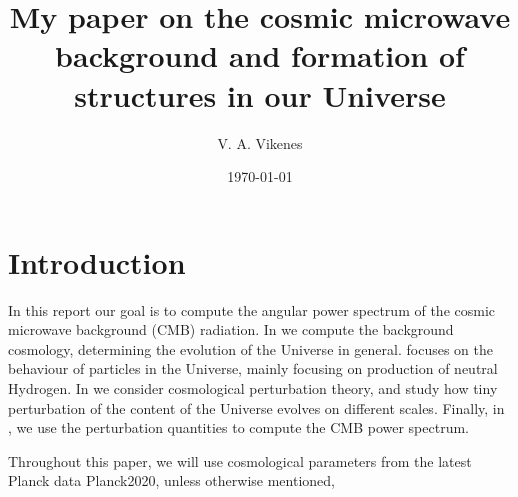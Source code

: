 \documentclass{aa}
\begin{document}
 
   \title{My paper on the cosmic microwave background and formation of structures in our Universe}

   \author{V. A. Vikenes}
 

   \date{\today}



   \maketitle

\section{Introduction} 
In this report our goal is to compute the angular power spectrum of the cosmic microwave background (CMB) radiation. In  we compute the background cosmology, determining the evolution of the Universe in general.  focuses on the behaviour of particles in the Universe, mainly focusing on production of neutral Hydrogen. In  we consider cosmological perturbation theory, and study how tiny perturbation of the content of the Universe evolves on different scales. Finally, in , we use the perturbation quantities to compute the CMB power spectrum.  

Throughout this paper, we will use cosmological parameters from the latest Planck data {Planck2020}, unless otherwise mentioned,
\end{document}
